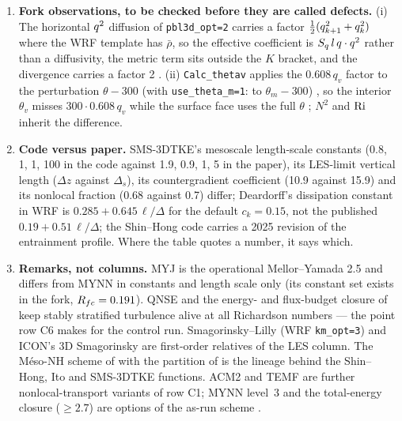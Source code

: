 \begin{small}
\begin{enumerate}[leftmargin=*,itemsep=2pt]
\item \textbf{Fork observations, to be checked before they are called defects.} (i) The horizontal
$q^{2}$ diffusion of \texttt{pbl3d\_opt=2} carries a factor $\tfrac12(q^{2}_{k+1} + q^{2}_k)$ where the
WRF template has $\bar\rho$, so the effective coefficient is $S_q\,l\,q\cdot q^{2}$ rather than a
diffusivity, the metric term sits outside the $K$ bracket, and the divergence carries a factor 2
. (ii) \texttt{Calc\_thetav} applies the $0.608\,q_v$ factor to the
perturbation $\theta - 300$ (with \texttt{use\_theta\_m=1}: to $\theta_m - 300$) , so the
interior $\theta_v$ misses $300 \cdot 0.608\,q_v$ while the surface face uses the full $\theta$
; $N^2$ and $\mathrm{Ri}$ inherit the difference.
\item \textbf{Code versus paper.} SMS-3DTKE's mesoscale length-scale constants (0.8, 1, 1, 100 in
the code against 1.9, 0.9, 1, 5 in the paper), its LES-limit vertical length ($\Delta z$ against
$\Delta_s$), its countergradient coefficient (10.9 against 15.9) and its nonlocal fraction (0.68
against 0.7) differ; Deardorff's dissipation constant in WRF is $0.285 + 0.645\,\ell/\Delta$ for the
default $c_k = 0.15$, not the published $0.19 + 0.51\,\ell/\Delta$; the Shin--Hong code carries a
2025 revision of the entrainment profile. Where the table quotes a number, it says which.
\item \textbf{Remarks, not columns.} MYJ \parencite{janjic1994} is the operational Mellor--Yamada
2.5 and differs from MYNN in constants and length scale only (its constant set exists in the fork,
$R_{fc} = 0.191$). QNSE \parencite{sukoriansky2005} and the energy- and flux-budget closure of
\textcite{zilitinkevich2013} keep stably stratified turbulence alive at all Richardson numbers ---
the point row C6 makes for the control run. Smagorinsky--Lilly \parencite{smagorinsky1963,lilly1962}
(WRF \texttt{km\_opt=3}) and ICON's 3D Smagorinsky \parencite{dipankar2015,goger2024} are first-order
relatives of the LES column. The Méso-NH scheme of \textcite{cuxart2000} with the partition of
\textcite{honnert2011} is the lineage behind the Shin--Hong, Ito and SMS-3DTKE functions. ACM2
\parencite{pleim2007} and TEMF \parencite{angevine2010} are further nonlocal-transport variants of
row C1; MYNN level~3 and the total-energy closure ($\ge 2.7$) are options of the as-run scheme
\parencite{olson2019}.

\end{enumerate}
\end{small}
